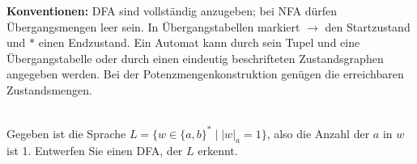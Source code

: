 \newcommand{\printpraesenzlsg}{false}
\newcommand{\printloesungen}{true}
\newcommand{\printbewertungen}{false}
\newcommand{\blattnummer}{6}

\usepackage{bussproofs}

\iforiginal{}

\begin{notes}\small\raggedright
\textbf{Konventionen:} DFA sind vollständig anzugeben; bei NFA dürfen
Übergangsmengen leer sein. In Übergangstabellen markiert $\to$ den Startzustand
und $*$ einen Endzustand. Ein Automat kann durch sein Tupel und eine
Übergangstabelle oder durch einen eindeutig beschrifteten Zustandsgraphen angegeben werden.
Bei der Potenzmengenkonstruktion genügen die erreichbaren Zustandsmengen.
\end{notes}

\\

Gegeben ist die Sprache $L = \{ w \in \{a,b\}^* \mid |w|_a=1 \}$, also die Anzahl der $a$ in $w$ ist 1.
Entwerfen Sie einen DFA, der $L$ erkennt.

